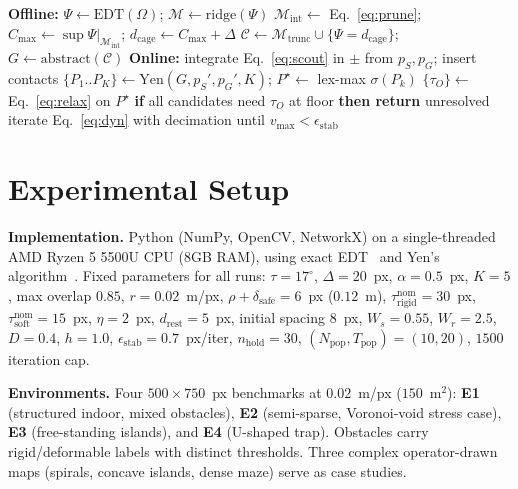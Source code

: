 \documentclass[conference]{IEEEtran}
\begin{document}
\begin{algorithm}[htbp]
\caption{Topological Cage query}
\label{alg:query}
\begin{algorithmic}[1]
\STATE \textbf{Offline:} $\Psi\!\leftarrow\!\mathrm{EDT}(\Omega)$; $\mathcal{M}\!\leftarrow\!\mathrm{ridge}(\Psi)$
\STATE $\mathcal{M}_{\mathrm{int}}\!\leftarrow\!$ Eq.~\eqref{eq:prune}; $C_{\max}\!\leftarrow\!\sup\Psi|_{\mathcal{M}_{\mathrm{int}}}$; $d_{\mathrm{cage}}\!\leftarrow\!C_{\max}\!+\!\Delta$
\STATE $\mathcal{C}\!\leftarrow\!\mathcal{M}_{\mathrm{trunc}}\cup\{\Psi\!=\!d_{\mathrm{cage}}\}$; $G\!\leftarrow\!\mathrm{abstract}(\mathcal{C})$
\STATE \textbf{Online:} integrate Eq.~\eqref{eq:scout} in $\pm$ from $p_S,p_G$; insert contacts
\STATE $\{P_1..P_K\}\leftarrow\mathrm{Yen}(G,p_S',p_G',K)$; $P^\star\leftarrow$ lex-max $\sigma(P_k)$
\STATE $\{\tau_O\}\leftarrow$ Eq.~\eqref{eq:relax} on $P^\star$
\STATE \textbf{if} all candidates need $\tau_O$ at floor \textbf{then return} unresolved
\STATE iterate Eq.~\eqref{eq:dyn} with decimation until $v_{\max}<\epsilon_{\mathrm{stab}}$
\end{algorithmic}
\end{algorithm}

\section{Experimental Setup}
\label{sec:setup}

\textbf{Implementation.} Python (NumPy, OpenCV, NetworkX) on a single-threaded AMD Ryzen 5 5500U CPU (8GB RAM), using exact EDT~\cite{felzenszwalb2012} and Yen's algorithm~\cite{yen1971}. Fixed parameters for all runs: $\tau=17^\circ$, $\Delta=20$~px, $\alpha=0.5$~px, $K=5$, max overlap $0.85$, $r=0.02$~m/px, $\rho+\delta_{\mathrm{safe}}=6$~px ($0.12$~m), $\tau^{\mathrm{nom}}_{\mathrm{rigid}}=30$~px, $\tau^{\mathrm{nom}}_{\mathrm{soft}}=15$~px, $\eta=2$~px, $d_{\mathrm{rest}}=5$~px, initial spacing $8$~px, $W_s=0.55$, $W_r=2.5$, $D=0.4$, $h=1.0$, $\epsilon_{\mathrm{stab}}=0.7$~px/iter, $n_{\mathrm{hold}}=30$, $(N_{\mathrm{pop}},T_{\mathrm{pop}})=(10,20)$, $1500$ iteration cap.

\textbf{Environments.} Four $500\times750$~px benchmarks at $0.02$~m/px ($150$~m$^2$): \textbf{E1} (structured indoor, mixed obstacles), \textbf{E2} (semi-sparse, Voronoi-void stress case), \textbf{E3} (free-standing islands), and \textbf{E4} (U-shaped trap). Obstacles carry rigid/deformable labels with distinct thresholds. Three complex operator-drawn maps (spirals, concave islands, dense maze) serve as case studies.
\end{document}
